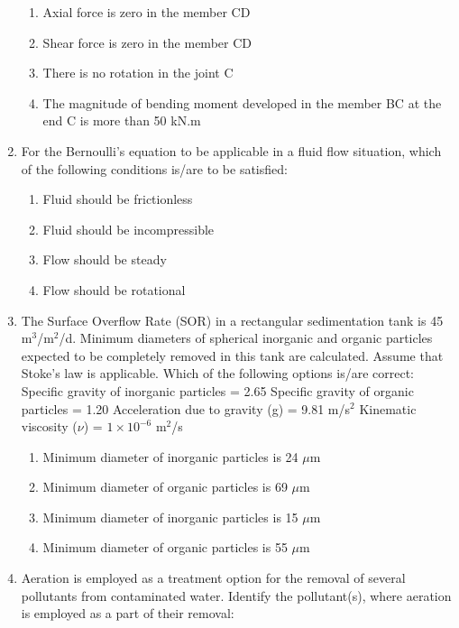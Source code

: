 \documentclass[journal,12pt,onecolumn]{article}
\theoremstyle{remark}
\begin{document}
\begin{enumerate}
\hfill{}
\begin{enumerate}
    \item Axial force is zero in the member CD
    \item Shear force is zero in the member CD
    \item There is no rotation in the joint C
    \item The magnitude of bending moment developed in the member BC at the end C is more than 50 kN.m
\end{enumerate}

\item For the Bernoulli's equation to be applicable in a fluid flow situation, which of the following conditions is/are to be satisfied:

\hfill{}
\begin{enumerate}
    \item Fluid should be frictionless
    \item Fluid should be incompressible
    \item Flow should be steady
    \item Flow should be rotational
\end{enumerate}

\item The Surface Overflow Rate (SOR) in a rectangular sedimentation tank is 45 m$^3$/m$^2$/d. Minimum diameters of spherical inorganic and organic particles expected to be completely removed in this tank are calculated. Assume that Stoke's law is applicable. Which of the following options is/are correct:
Specific gravity of inorganic particles = 2.65
Specific gravity of organic particles = 1.20
Acceleration due to gravity (g) = 9.81 m/s$^2$
Kinematic viscosity ($\nu$) = $1 \times 10^{-6}$ m$^2$/s

\hfill{}
\begin{enumerate}

    \item Minimum diameter of inorganic particles is 24 $\mu$m
    \item Minimum diameter of organic particles is 69 $\mu$m
    \item Minimum diameter of inorganic particles is 15 $\mu$m
    \item Minimum diameter of organic particles is 55 $\mu$m
   
\end{enumerate}

\item Aeration is employed as a treatment option for the removal of several pollutants from contaminated water.
Identify the pollutant(s), where aeration is employed as a part of their removal:


\end{enumerate}
\end{document}
